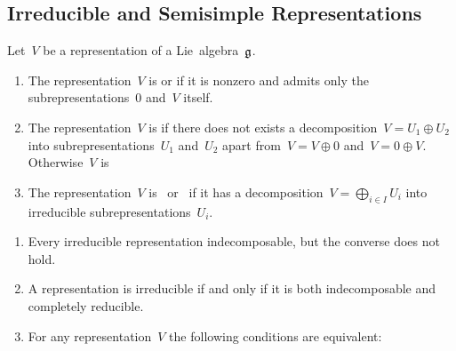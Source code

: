 \subsection{Irreducible and Semisimple Representations}


\begin{definition}
  Let~$V$ be a representation of a Lie~algebra~$\mathfrak{g}$.
  \begin{enumerate}
    \item
      The representation~$V$ is  or  if it is nonzero and admits only the subrepresentations~$0$ and~$V$ itself.
    \item
      The representation~$V$ is  if there does not exists a decomposition~$V = U_1 \oplus U_2$ into subrepresentations~$U_1$ and~$U_2$ apart from~$V = V \oplus 0$ and~$V = 0 \oplus V$.
      Otherwise~$V$ is 
    \item
      The representation~$V$ is~ or~ if it has a decomposition~$V = \bigoplus_{i \in I} U_i$ into irreducible subrepresentations~$U_i$.
  \end{enumerate}
\end{definition}


\begin{remark}
  \leavevmode
  \begin{enumerate}
    \item
      Every irreducible representation indecomposable, but the converse does not hold.
    \item
      A representation is irreducible if and only if it is both indecomposable and completely reducible.
    \item
      For any representation~$V$ the following conditions are equivalent:
  \end{enumerate}
\end{remark}


